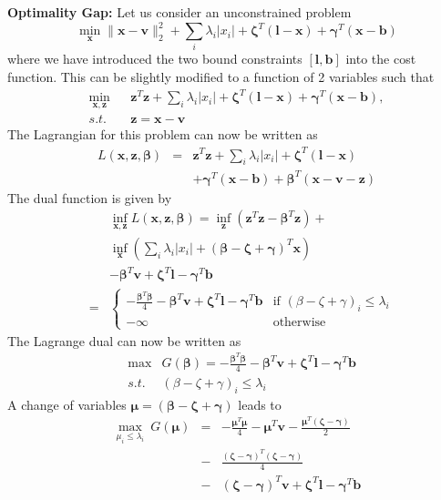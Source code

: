 \documentclass{article}
\newcommand{\mathbs}{\boldsymbol}
\begin{document}
\textbf{Optimality Gap: } Let us consider an unconstrained problem
\begin{equation*}
    \min_\mathbf{x} \|\mathbf{x-v}\|_2^2 + \sum_i \lambda_i |{x}_i| + \mathbs{\zeta}^T(\mathbf{l-x}) + \mathbs{\gamma}^T(\mathbf{x-b})
\end{equation*}
where we have introduced the two bound constraints $[\mathbf{l,b}]$ into the cost function. This can be slightly modified to a function of 2 variables such that
\begin{eqnarray*}
  \min_{\mathbf{x,z}} && \mathbf{z}^T\mathbf{z} + \sum_i \lambda_i |{x}_i| + \mathbs{\zeta}^T(\mathbf{l-x}) + \mathbs{\gamma}^T(\mathbf{x-b}),\\
  s.t.&&  \mathbf{z} =  \mathbf{x-v}
\end{eqnarray*}
The Lagrangian for this problem can now be written as 
\begin{eqnarray*}
L(\mathbf{x,z},\mathbs{\beta})&=& \mathbf{z}^T\mathbf{z} + \sum_i \lambda_i |{x}_i| +\mathbs{\zeta}^T (\mathbf{l-x}) \\
&& + \mathbs{\gamma}^T(\mathbf{x-b}) + \mathbs{\beta}^T(\mathbf{x-v-z})
\end{eqnarray*}
The dual function is given by
\begin{eqnarray*}
&& \inf_{\mathbf{x,z}}L(\mathbf{x,z},\mathbs{\beta}) =  \inf_\mathbf{z}(\mathbf{z}^T\mathbf{z}-\mathbs{\beta}^T\mathbf{z}) + \\
 && \inf_\mathbf{x}(\sum_i \lambda_i |{x}_i| + (\mathbs{\beta-\zeta+\gamma})^T\mathbf{x}) \\
 &&-\mathbs{\beta}^T\mathbf{v}+\mathbs{\zeta}^T\mathbf{l}-\mathbs{\gamma}^T\mathbf{b} \\
   &=&
  \begin{cases}
   -\frac{\mathbs{\beta}^T\mathbs{\beta}}{4}-\mathbs{\beta}^T\mathbf{v}+\mathbs{\zeta}^T\mathbf{l}-\mathbs{\gamma}^T\mathbf{b} & \text{if } ({\beta-\zeta+\gamma})_i \le \lambda_i \\
   -\infty & \text{otherwise }
  \end{cases}
\end{eqnarray*}
The Lagrange dual can now be written as
\begin{eqnarray*}
& \max & G(\mathbs{\beta}) = -\frac{\mathbs{\beta}^T\mathbs{\beta}}{4}-\mathbs{\beta}^T\mathbf{v}+\mathbs{\zeta}^T\mathbf{l}-\mathbs{\gamma}^T\mathbf{b} \\
  &s.t.& (\beta-\zeta+\gamma)_i \le \lambda_i
\end{eqnarray*}
A change of variables $\mathbs{\mu = (\beta-\zeta+\gamma)}$ leads to
\begin{eqnarray*}
\max_{\mu_i \le \lambda_i} ~G(\mathbs{\mu}) &=& -\frac{\mathbs{\mu}^T\mathbs{\mu}}{4}-\mathbs{\mu}^T\mathbf{v} - \frac{\mathbs{\mu}^T(\mathbs{\zeta-\gamma})}{2} \\
  &-&\frac{(\mathbs{\zeta-\gamma})^T(\mathbs{\zeta-\gamma})}{4} \\
  &-&(\mathbs{\zeta-\gamma})^T\mathbf{v} +\mathbs{\zeta}^T\mathbf{l}-\mathbs{\gamma}^T\mathbf{b}
\end{eqnarray*}
\end{document}
